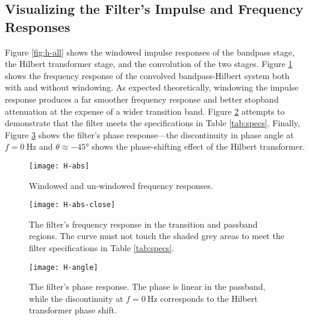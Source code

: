 \subsection{Visualizing the Filter's Impulse and Frequency Responses}
Figure \ref{fig:h-all} shows the windowed impulse responses of the bandpass stage, the Hilbert transformer stage, and the convolution of the two stages.
Figure \ref{fig:H-abs} shows the frequency response of the convolved bandpass-Hilbert system both with and without windowing.
As expected theoretically, windowing the impulse response produces a far smoother frequency response and better stopband attenuation at the expense of a wider transition band.
Figure \ref{fig:H-abs-close} attempts to demonstrate that the filter meets the specifications in Table \ref{tab:specs}.
Finally, Figure \ref{fig:H-angle} shows the filter's phase response---the discontinuity in phase angle at $ f = \SI{0}{\hertz} $ and $ \theta \approx - \ang{45} $ shows the phase-shifting effect of the Hilbert transformer.

\newpage


\begin{figure}[htb!]
	\centering
	\texttt{[image: H-abs]}
    \vspace{-3.5ex}
	\caption{Windowed and un-windowed frequency responses.}
	\label{fig:H-abs}
\end{figure}

\begin{figure}[htb!]
	\centering
	\texttt{[image: H-abs-close]}
    \vspace{-2ex}
	\caption{The filter's frequency response in the transition and passband regions.
    The curve must not touch the shaded grey areas to meet the filter specifications in Table \ref{tab:specs}.}
	\label{fig:H-abs-close}
\end{figure}

\begin{figure}[htb!]
	\centering
	\texttt{[image: H-angle]}
    \vspace{-2ex}
	\caption{The filter's phase response.
    The phase is linear in the passband, while the discontinuity at $ f = \SI{0}{\hertz} $ corresponds to the Hilbert transformer phase shift.}
	\label{fig:H-angle}
\end{figure}

